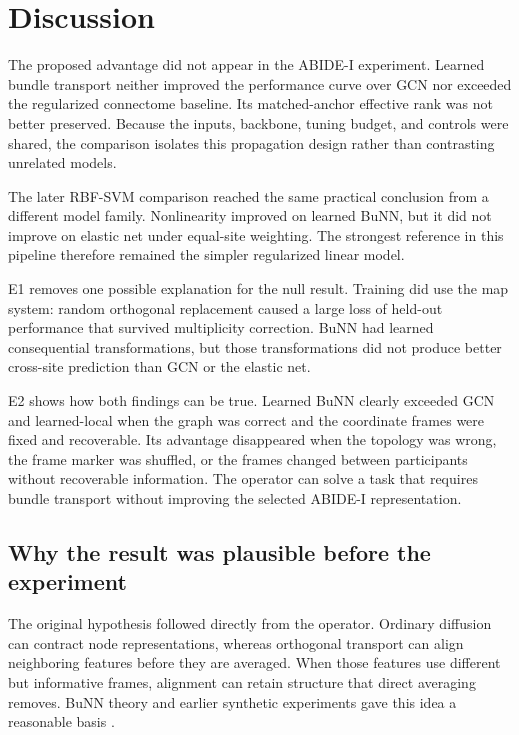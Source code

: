 \documentclass[11pt,a4paper]{article}
\begin{document}
\section{Discussion}

The proposed advantage did not appear in the ABIDE-I experiment. Learned
bundle transport neither improved the performance curve over GCN nor exceeded
the regularized connectome baseline. Its matched-anchor effective rank was not
better preserved. Because the inputs, backbone, tuning budget, and controls
were shared, the comparison isolates this propagation design rather than
contrasting unrelated models.

The later RBF-SVM comparison reached the same practical conclusion from a
different model family. Nonlinearity improved on learned BuNN, but it did not
improve on elastic net under equal-site weighting. The strongest reference in
this pipeline therefore remained the simpler regularized linear model.

E1 removes one possible explanation for the null result. Training did use the
map system: random orthogonal replacement caused a large loss of held-out
performance that survived multiplicity correction. BuNN had learned
consequential transformations, but those transformations did not produce
better cross-site prediction than GCN or the elastic net.

E2 shows how both findings can be true. Learned BuNN clearly exceeded GCN and
learned-local when the graph was correct and the coordinate frames were fixed
and recoverable. Its advantage disappeared when the topology was wrong, the
frame marker was shuffled, or the frames changed between participants without
recoverable information. The operator can solve a task that requires bundle
transport without improving the selected ABIDE-I representation.

\subsection{Why the result was plausible before the experiment}

The original hypothesis followed directly from the operator. Ordinary
diffusion can contract node representations, whereas orthogonal transport can
align neighboring features before they are averaged. When those features use
different but informative frames, alignment can retain structure that direct
averaging removes. BuNN theory and earlier synthetic experiments gave this
idea a reasonable basis \cite{bamberger2025bundle}.
\end{document}
